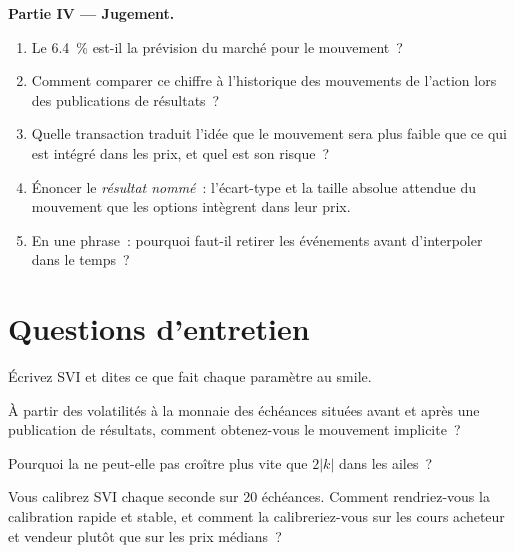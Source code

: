 \begin{problem}
\medskip\noindent\textbf{Partie IV --- Jugement.}
\begin{enumerate}[resume]
\item Le 6.4~\% est-il la prévision du marché pour le mouvement~?
\item Comment comparer ce chiffre à l'historique des mouvements de l'action lors des publications de résultats~?
\item Quelle transaction traduit l'idée que le mouvement sera plus faible que ce qui est intégré dans les prix, et quel est son risque~?
\item Énoncer le \emph{résultat nommé}~: l'écart-type et la taille absolue attendue du mouvement
que les options intègrent dans leur prix.
\item En une phrase~: pourquoi faut-il retirer les événements avant d'interpoler dans le temps~?
\end{enumerate}
\end{problem}

\section{Questions d'entretien}

\begin{interviewq}\label{iq:dv:parametrising-the-surface:1}
Écrivez SVI et dites ce que fait chaque paramètre au smile.
\end{interviewq}

\begin{interviewq}\label{iq:dv:parametrising-the-surface:2}
À partir des volatilités à la monnaie des échéances situées avant et après une publication de résultats, comment
obtenez-vous le mouvement implicite~?
\end{interviewq}

\begin{interviewq}\label{iq:dv:parametrising-the-surface:3}
Pourquoi la  ne peut-elle pas croître plus vite que $2|k|$ dans les ailes~?
\end{interviewq}

\begin{interviewq}\label{iq:dv:parametrising-the-surface:4}
Vous calibrez SVI chaque seconde sur 20 échéances. Comment rendriez-vous la calibration rapide et stable, et
comment la calibreriez-vous sur les cours acheteur et vendeur plutôt que sur les prix médians~?
\end{interviewq}

